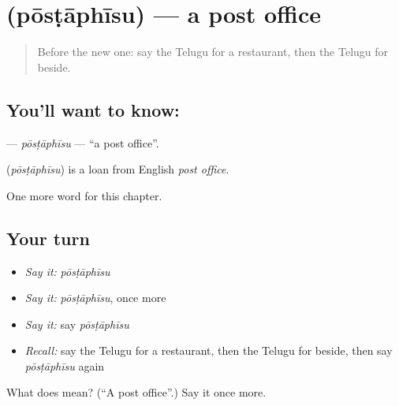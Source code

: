 \section[\texorpdfstring{\te{పోస్టాఫీసు} (pōsṭāphīsu)}{పోస్టాఫీసు (pōsṭāphīsu)}]{ (pōsṭāphīsu) — a post office}

\label{lesson:TE-C173-postaphisu}



\begin{quote}
Before the new one: say the Telugu for a restaurant, then the Telugu for beside.
\end{quote}

\subsection*{You'll want to know: }
\textbf{} — \emph{pōsṭāphīsu} — \textquotedblleft{}a post office\textquotedblright{}.

\begin{cousinweb}
\textbf{} (\emph{pōsṭāphīsu}) is a loan from English \emph{post office}.
\end{cousinweb}

\begin{grammarlens}[title={What you've built}]
One more word for this chapter.
\end{grammarlens}

\subsection*{Your turn}
\begin{itemize}
\raggedright
  \item \emph{Say it:} \emph{pōsṭāphīsu}
  \item \emph{Say it:} \emph{pōsṭāphīsu}, once more
  \item \emph{Say it:} say \emph{pōsṭāphīsu}
  \item \emph{Recall:} say the Telugu for a restaurant, then the Telugu for beside, then say \emph{pōsṭāphīsu} again
\end{itemize}

\begin{tcolorbox}[breakable,colback=teal!4,colframe=teal!35!black,title={Before you move on}]
What does  mean? (\textquotedblleft{}A post office\textquotedblright{}.) Say it once more.
\end{tcolorbox}
